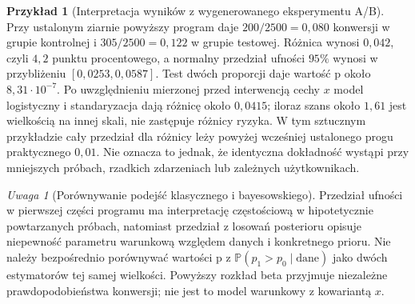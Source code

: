\documentclass[11pt,a4paper,oneside]{report}
\numberwithin{equation}{chapter}
\theoremstyle{plain}
\theoremstyle{definition}
\newtheorem{przyklad}{Przykład}[chapter]
\theoremstyle{remark}
\newtheorem{uwaga}{Uwaga}[chapter]
\newcommand{\Prob}{\mathbb P}
\begin{document}
\begin{przyklad}[Interpretacja wyników z wygenerowanego eksperymentu A/B]
Przy ustalonym ziarnie powyższy program daje $200/2500=0{,}080$ konwersji w grupie kontrolnej i $305/2500=0{,}122$ w grupie testowej. Różnica wynosi $0{,}042$, czyli $4{,}2$ punktu procentowego, a normalny przedział ufności $95\%$ wynosi w przybliżeniu $[0{,}0253,0{,}0587]$. Test dwóch proporcji daje wartość p około $8{,}31\cdot10^{-7}$. Po uwzględnieniu mierzonej przed interwencją cechy $x$ model logistyczny i standaryzacja dają różnicę około $0{,}0415$; iloraz szans około $1{,}61$ jest wielkością na innej skali, nie zastępuje różnicy ryzyka. W tym sztucznym przykładzie cały przedział dla różnicy leży powyżej wcześniej ustalonego progu praktycznego $0{,}01$. Nie oznacza to jednak, że identyczna dokładność wystąpi przy mniejszych próbach, rzadkich zdarzeniach lub zależnych użytkownikach.
\end{przyklad}

\begin{uwaga}[Porównywanie podejść klasycznego i bayesowskiego]
Przedział ufności w pierwszej części programu ma interpretację częstościową w hipotetycznie powtarzanych próbach, natomiast przedział z losowań posterioru opisuje niepewność parametru warunkową względem danych i konkretnego prioru. Nie należy bezpośrednio porównywać wartości p z $\Prob(p_1>p_0\mid\text{dane})$ jako dwóch estymatorów tej samej wielkości. Powyższy rozkład beta przyjmuje niezależne prawdopodobieństwa konwersji; nie jest to model warunkowy z kowariantą $x$.
\end{uwaga}
\end{document}
